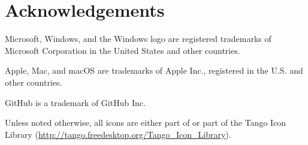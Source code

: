 
\chapter*{Acknowledgements}

Microsoft, Windows, and the Windows logo are registered trademarks of Microsoft Corporation in the United States and other countries.

Apple, Mac, and macOS are trademarks of Apple Inc., registered in the U.S. and other countries.

GitHub is a trademark of GitHub Inc.

Unless noted otherwise, all icons are either part of {\Tw} or part of the Tango Icon Library (\url{http://tango.freedesktop.org/Tango_Icon_Library}).

\nocite{dkn1,dkn2,lla,companion,xetmain,xetshol}



\printindex
